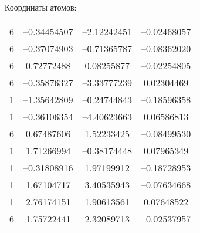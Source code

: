 {Координаты атомов:
\begin{center}
\begin{tabular}{cccc}
   6  &  --0.34454507 & --2.12242451 & --0.02468057\\
   6  &  --0.37074903 & --0.71365787 & --0.08362020\\
   6  &   0.72772488 &  0.08255877 & --0.02254805\\
   6  &  --0.35876327 & --3.33777239 &  0.02304469\\
   1  &  --1.35642809 & --0.24744843 & --0.18596358\\
   1  &  --0.36106354 & --4.40623663 &  0.06586813\\
   6  &   0.67487606 &  1.52233425 & --0.08499530\\
   1  &   1.71266994 & --0.38174448 &  0.07965349\\
   1  &  --0.31808916 &  1.97199912 & --0.18728953\\
   1  &   1.67104717 &  3.40535943 & --0.07634668\\
   1  &   2.76174151 &  1.90613561  & 0.07648522\\
   6  &   1.75722441 &  2.32089713  &--0.02537957\\
  \end{tabular}
\end{center}

}
